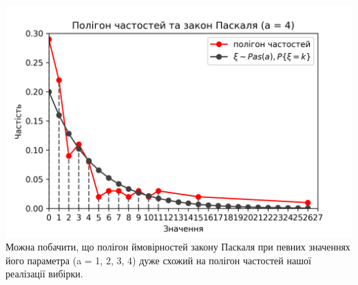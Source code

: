 \documentclass{article}
\begin{document}
\newline
\includegraphics[scale = 0.8]{pol+pas4}
\newline
Можна побачити, що полігон ймовірностей закону Паскаля
при певних значеннях його параметра (a = 1, 2, 3, 4) 
дуже схожий на полігон частостей нашої реалізації вибірки.
\newpage
\end{document}

